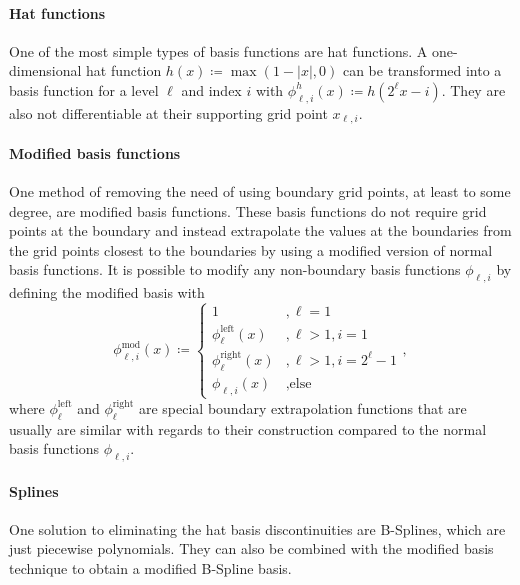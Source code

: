 \documentclass[
  a4paper,  %
  twoside,  %
  bibliography=totoc,
  headsepline,
  cleardoublepage=empty,
  parskip=half,
  draft=false
]{scrbook}
\begin{document}
\paragraph{Hat functions}
One of the most simple types of basis functions are hat functions.
A one-dimensional hat function $h(x) \coloneqq \max(1 - |x|,0)$ can be transformed into a basis function for a level $\ell$ and index $i$ with $\phi^h_{\ell,i}(x) \coloneqq h(2^\ell x-i)$.
They are also not differentiable at their supporting grid point $x_{\ell,i}$.

\paragraph{Modified basis functions}
One method of removing the need of using boundary grid points, at least to some degree, are modified basis functions.
These basis functions do not require grid points at the boundary and instead extrapolate the values at the boundaries from the grid points closest to the boundaries by using a modified version of normal basis functions.
It is possible to modify any non-boundary basis functions $\phi_{\ell,i}$ by defining the modified basis with
\begin{equation}
\phi^{\mathrm{mod}}_{\ell,i}(x) \coloneqq
\begin{cases}
1 &, \ell=1\\
\phi^{\mathrm{left}}_{\ell}(x)&, \ell>1, i=1\\
\phi^{\mathrm{right}}_{\ell}(x)&, \ell>1, i=2^\ell - 1\\
\phi_{\ell,i}(x)&, \text{else}
\end{cases},
\end{equation}
where $\phi^{\text{left}}_{\ell}$ and $\phi^{\text{right}}_{\ell}$ are special boundary extrapolation functions that are usually are similar with regards to their construction compared to the normal basis functions $\phi_{\ell,i}$.

\paragraph{Splines}
One solution to eliminating the hat basis discontinuities are B-Splines, which are just piecewise polynomials.
They can also be combined with the modified basis technique to obtain a modified B-Spline basis.
\end{document}
